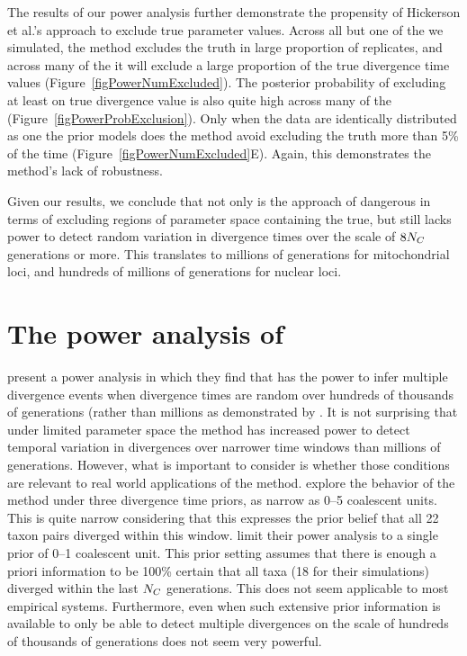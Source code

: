 \documentclass[letterpaper,12pt]{article}
\begin{document}
\begin{linenumbers}
The results of our power analysis further demonstrate the propensity of
Hickerson et al.'s \citeyear{Hickerson2013} approach to exclude true parameter
values.
Across all but one of the  we simulated, the method excludes the
truth in large proportion of replicates, and across many of the  it
will exclude a large proportion of the true divergence time values
(Figure~\ref{figPowerNumExcluded}).
The posterior probability of excluding at least on true divergence value is
also quite high across many of the 
(Figure~\ref{figPowerProbExclusion}).
Only when the data are identically distributed as one the prior models does
the method avoid excluding the truth more than 5\% of the time
(Figure~\ref{figPowerNumExcluded}E).
Again, this demonstrates the method's lack of robustness.

Given our results, we conclude that not only is the approach of
\citet{Hickerson2013} dangerous in terms of excluding regions of parameter
space containing the true, but still lacks power to detect random variation in
divergence times over the scale of $8N_C$ generations or more.
This translates to millions of generations for mitochondrial loci, and hundreds
of millions of generations for nuclear loci.



\section*{The power analysis of \citet{Hickerson2013}}
\citet{Hickerson2013} present a power analysis in which they find that
\msb has the power to infer multiple divergence events when divergence times
are random over hundreds of thousands of generations (rather than millions as
demonstrated by \citet{Oaks2012}.
It is not surprising that under limited parameter space the method has
increased power to detect temporal variation in divergences over narrower time
windows than millions of generations.
However, what is important to consider is whether those conditions are relevant
to real world applications of the method.
\citet{Oaks2012} explore the behavior of the method under three divergence time
priors, as narrow as 0--5 coalescent units. This is quite narrow considering
that this expresses the prior belief that all 22 taxon pairs diverged within
this window.
\citet{Hickerson2013} limit their power analysis to a single prior of 0--1
coalescent unit.
This prior setting assumes that there is enough a priori information to
be 100\% certain that all taxa (18 for their simulations) diverged within
the last $N_C$ generations.
This does not seem applicable to most empirical systems.
Furthermore, even when such extensive prior information is available to only be
able to detect multiple divergences on the scale of hundreds of thousands of
generations does not seem very powerful.


\end{linenumbers}
\end{document}
